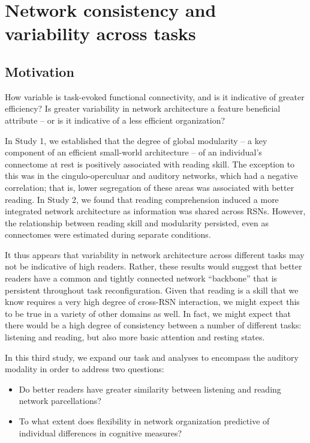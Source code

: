 \chapter{Network consistency and variability across tasks}

\section{Motivation}

How variable is task-evoked functional connectivity, and is it indicative of greater efficiency? Is greater variability in network architecture a feature beneficial attribute -- or is it indicative of a less efficient organization?

In Study 1, we established that the degree of global modularity -- a key component of an efficient small-world architecture -- of an individual's connectome at rest is positively associated with reading skill. The exception to this was in the cingulo-operculuar and auditory networks, which had a negative correlation; that is, lower segregation of these areas was associated with better reading. In Study 2, we found that reading comprehension induced a more integrated network architecture as information was shared across RSNs. However, the relationship between reading skill and modularity persisted, even as connectomes were estimated during separate conditions. 

It thus appears that variability in network architecture across different tasks may not be indicative of high readers. Rather, these results would suggest that better readers have a common and tightly connected network ``backbone'' that is persistent throughout task reconfiguration. Given that reading is a skill that we know requires a very high degree of cross-RSN interaction, we might expect this to be true in a variety of other domains as well. In fact, we might expect that there would be a high degree of consistency between a number of different tasks: listening and reading, but also more basic attention and resting states. 

In this third study, we expand our task and analyses to encompass the auditory modality in order to address two questions:

\begin{itemize}
    \item Do better readers have greater similarity between listening and reading network parcellations?
	\item To what extent does flexibility in network organization predictive of individual differences in cognitive measures?
\end{itemize} 

